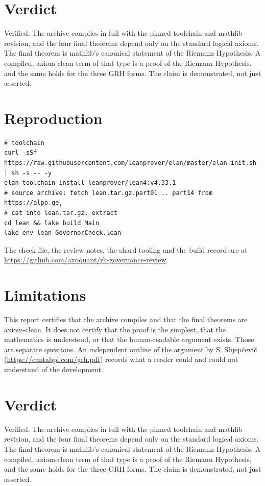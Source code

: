 \documentclass[11pt]{article}
\begin{document}
\section{Verdict}
Verified. The archive compiles in full with the pinned toolchain and mathlib revision, and the four final theorems depend only on the standard logical axioms. The final theorem is mathlib's canonical statement of the Riemann Hypothesis. A compiled, axiom-clean term of that type is a proof of the Riemann Hypothesis, and the same holds for the three GRH forms. The claim is demonstrated, not just asserted.

\section{Reproduction}
\begin{verbatim}
# toolchain
curl -sSf https://raw.githubusercontent.com/leanprover/elan/master/elan-init.sh | sh -s -- -y
elan toolchain install leanprover/lean4:v4.33.1
# source archive: fetch lean.tar.gz.part01 .. part14 from https://alpo.ge,
# cat into lean.tar.gz, extract
cd lean && lake build Main
lake env lean GovernorCheck.lean
\end{verbatim}
The check file, the review notes, the shard tooling and the build record are at \url{https://github.com/axoquant/rh-governance-review}.

\section{Limitations}
This report certifies that the archive compiles and that the final theorems are axiom-clean. It does not certify that the proof is the simplest, that the mathematics is understood, or that the human-readable argument exists. Those are separate questions. An independent outline of the argument by S. Slijep\v{c}evi\'c (\url{https://cantabpi.com/grh.pdf}) records what a reader could and could not understand of the development.

\section{Verdict}
Verified. The archive compiles in full with the pinned toolchain and mathlib revision, and the four final theorems depend only on the standard logical axioms. The final theorem is mathlib's canonical statement of the Riemann Hypothesis. A compiled, axiom-clean term of that type is a proof of the Riemann Hypothesis, and the same holds for the three GRH forms. The claim is demonstrated, not just asserted.
\end{document}
